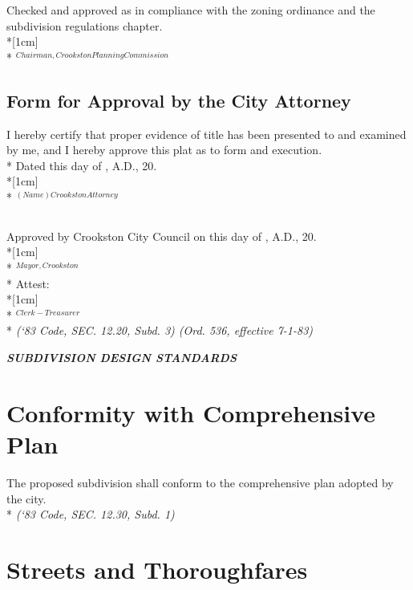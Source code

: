 \subsubsection{}
Checked and approved as in compliance with the zoning ordinance and the subdivision regulations chapter.\\*[1cm]
\fillable{5cm}\\*
$^{Chairman, Crookston Planning Commission}$
\subsection{Form for Approval by the City Attorney}
I hereby certify that proper evidence of title has been presented to and examined by me, and I hereby approve this plat as to form and execution.\\*
Dated this \fillable{1cm} day of \fillable{2cm}, A.D., 20\fillable{1cm}.\\*[1cm]
\fillable{5cm}\\*
$^{(Name) Crookston Attorney}$
\subsection{}
Approved by Crookston City Council on this \fillable{1cm} day of \fillable{2cm}, A.D., 20\fillable{1cm}.\\*[1cm]
\fillable{5cm}\\*
$^{Mayor, Crookston}$\\*
Attest:\\*[1cm]
\fillable{5cm}\\*
$^{Clerk-Treasurer}$\\*
\emph{(‘83 Code, SEC. 12.20, Subd. 3)  (Ord. 536, effective 7-1-83)}

\begin{center}
    \emph{\textbf{\LARGE{SUBDIVISION DESIGN STANDARDS}}}
\end{center}

\setcounter{section}{29}
\section{Conformity with Comprehensive Plan}
The proposed subdivision shall conform to the comprehensive plan adopted by the city.\\*
\emph{(‘83 Code, SEC. 12.30, Subd. 1)}

\section{Streets and Thoroughfares}
